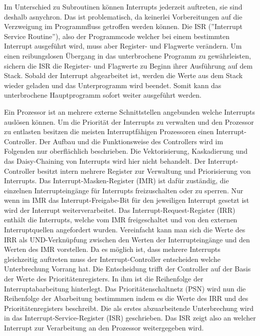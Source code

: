 \documentclass[12pt]{article}
\begin{document}
\noindent Im Unterschied zu Subroutinen können Interrupts jederzeit auftreten, sie sind deshalb asnychron. Das ist problematisch, da keinerlei Vorbereitungen auf die Verzweigung im Programmfluss getroffen werden können. Die ISR (''Interrupt Service Routine''), also der Programmcode welcher bei einem bestimmten Interrupt ausgeführt wird, muss aber Register- und Flagwerte verändern. Um einen reibungslosen Übergang in das unterbrochene Programm zu gewährleisten, sichern die ISR die Register- und Flagwerte zu Beginn ihrer Ausführung auf dem Stack. Sobald der Interrupt abgearbeitet ist, werden die Werte aus dem Stack wieder geladen und das Unterprogramm wird beendet. Somit kann das unterbrochene Hauptprogramm sofort weiter ausgeführt werden.
 
\noindent Ein Prozessor ist an mehrere externe Schnittstellen angebunden welche Interrupts auslösen können. Um die Priorität der Interrupts zu verwalten und den Prozessor zu entlasten besitzen die meisten Interruptfähigen Prozessoren einen Interrupt-Controller. Der Aufbau und die Funktionsweise des Controllers wird im Folgenden nur oberflächlich beschrieben. Die Vektorisierung, Kaskadierung und das Daisy-Chaining von Interrupts wird hier nicht behandelt.
Der Interrupt-Controller besitzt intern mehrere Register zur Verwaltung und Priorisierung von Interrupts. Das Interrupt-Masken-Register (IMR) ist dafür zuständig, die einzelnen Interrupteingänge für Interrupts freizuschalten oder zu sperren. Nur wenn im IMR das Interrupt-Freigabe-Bit für den jeweiligen Interrupt gesetzt ist wird der Interrupt weiterverarbeitet. Das Interrupt-Request-Register (IRR) enthält die Interrupts, welche vom IMR freigeschaltet  und von den externen Interruptquellen angefordert wurden. Vereinfacht kann man sich die Werte des IRR als UND-Verknüpfung zwischen den Werten der Interrupteingänge und den Werten des IMR vorstellen. Da es möglich ist, dass mehrere Interrupts gleichzeitig auftreten muss der Interrupt-Controller entscheiden welche Unterbrechung Vorrang hat. Die Entscheidung trifft der Controller auf der Basis der Werte des Prioritätenregisters. In ihm ist die Reihenfolge der Interruptabarbeitung hinterlegt. Das Prioritätenschaltnetz (PSN) wird nun die Reihenfolge der Abarbeitung bestimmmen indem es die Werte des IRR und des Prioritätenregisters beschreibt. Die als erstes abzuarbeitende Unterbrechung wird in das Interrupt-Service-Register (ISR) geschrieben. Das ISR zeigt also an welcher Interrupt zur Verarbeitung an den Prozessor weitergegeben wird. \cite[S.114ff]{mikroprozessortechnik2011}
\end{document}
